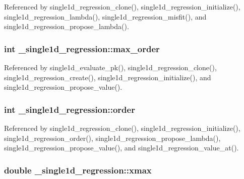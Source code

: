 Referenced by single1d\+\_\+regression\+\_\+clone(), single1d\+\_\+regression\+\_\+initialize(), single1d\+\_\+regression\+\_\+lambda(), single1d\+\_\+regression\+\_\+misfit(), and single1d\+\_\+regression\+\_\+propose\+\_\+lambda().

\subsubsection[{\texorpdfstring{max\+\_\+order}{max_order}}]{\setlength{\rightskip}{0pt plus 5cm}int \+\_\+single1d\+\_\+regression\+::max\+\_\+order}\hypertarget{struct__single1d__regression_aaa1dcb3d87135e2e34168a5db97e7436}{}\label{struct__single1d__regression_aaa1dcb3d87135e2e34168a5db97e7436}


Referenced by single1d\+\_\+evaluate\+\_\+pk(), single1d\+\_\+regression\+\_\+clone(), single1d\+\_\+regression\+\_\+create(), single1d\+\_\+regression\+\_\+initialize(), and single1d\+\_\+regression\+\_\+propose\+\_\+value().

\subsubsection[{\texorpdfstring{order}{order}}]{\setlength{\rightskip}{0pt plus 5cm}int \+\_\+single1d\+\_\+regression\+::order}\hypertarget{struct__single1d__regression_a9759de630ec4cebaf926d3a97ce6a396}{}\label{struct__single1d__regression_a9759de630ec4cebaf926d3a97ce6a396}


Referenced by single1d\+\_\+regression\+\_\+clone(), single1d\+\_\+regression\+\_\+initialize(), single1d\+\_\+regression\+\_\+order(), single1d\+\_\+regression\+\_\+propose\+\_\+lambda(), single1d\+\_\+regression\+\_\+propose\+\_\+value(), and single1d\+\_\+regression\+\_\+value\+\_\+at().

\subsubsection[{\texorpdfstring{xmax}{xmax}}]{\setlength{\rightskip}{0pt plus 5cm}double \+\_\+single1d\+\_\+regression\+::xmax}\hypertarget{struct__single1d__regression_a84fc6de10079aa7ea68e019ddff0a859}{}\label{struct__single1d__regression_a84fc6de10079aa7ea68e019ddff0a859}


